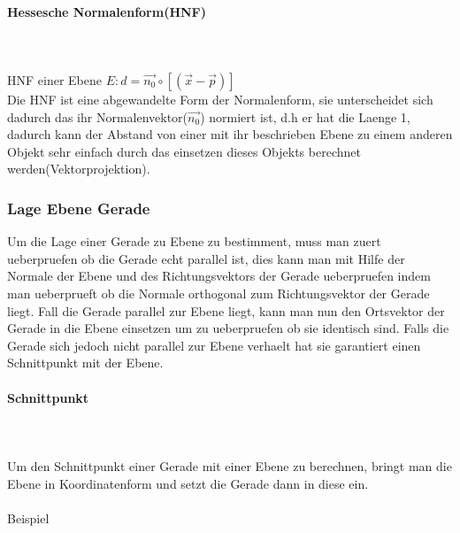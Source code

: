 \documentclass[a4paper]{article} %
\begin{document}
	\paragraph{Hessesche Normalenform(HNF)}
	\hspace{0 cm} \\ \noindent \\
	HNF einer Ebene $E : d = \vec{n_0}\circ\left[\left(\vec{x}-\vec{p}\right)   \right]$\\
	Die HNF ist eine abgewandelte Form der Normalenform, sie unterscheidet sich dadurch das ihr Normalenvektor($\vec{n_0}$)
	normiert ist, d.h er hat die Laenge 1, dadurch kann der Abstand von einer mit ihr beschrieben Ebene zu einem anderen Objekt sehr einfach durch das einsetzen dieses Objekts berechnet werden(Vektorprojektion). 
	\subsubsection{Lage Ebene Gerade}
	Um die Lage einer Gerade zu Ebene zu bestimment, muss man zuert ueberpruefen ob die Gerade echt parallel ist, dies kann man mit Hilfe der Normale der Ebene und des Richtungsvektors der Gerade ueberpruefen indem man ueberprueft ob die Normale orthogonal zum Richtungsvektor der Gerade liegt.
	Fall die Gerade parallel zur Ebene liegt, kann man nun den Ortsvektor der Gerade in die Ebene einsetzen um zu ueberpruefen ob sie identisch sind.
	Falls die Gerade sich jedoch nicht parallel zur Ebene verhaelt hat sie garantiert einen Schnittpunkt mit der Ebene. 
	\paragraph{Schnittpunkt}
		\hspace{0 cm} \\ \noindent \\
		Um den Schnittpunkt einer Gerade mit einer Ebene zu berechnen, bringt man die Ebene in Koordinatenform und setzt die Gerade dann in diese ein.
		\\\\Beispiel
\end{document}
